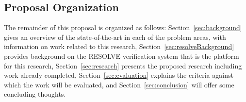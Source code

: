 \subsection{Proposal Organization}
The remainder of this proposal is organized as follows: Section~\ref{sec:background} gives an overview of the state-of-the-art in each of the problem areas, with information on work related to this research, Section~\ref{sec:resolveBackground} provides background on the RESOLVE verification system that is the platform for this research, Section~\ref{sec:research} presents the proposed research including work already completed, Section~\ref{sec:evaluation} explains the criteria against which the work will be evaluated, and Section~\ref{sec:conclusion} will offer some concluding thoughts.
